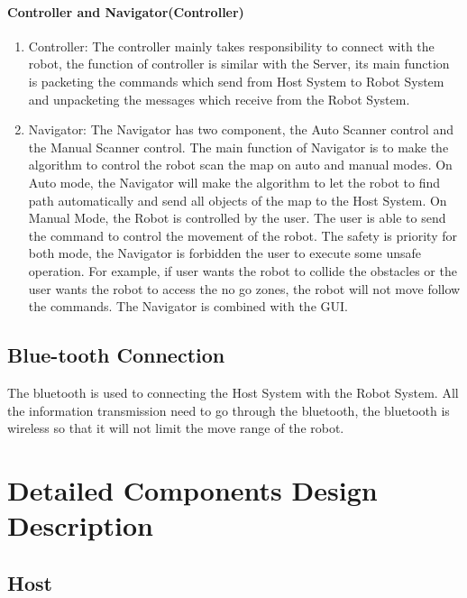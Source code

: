 \documentclass[11pt, a4paper]{report}
\begin{document}
\paragraph{Controller and Navigator(Controller)}
\begin{enumerate}
\item Controller: The controller mainly takes responsibility to connect with the robot, the function of controller is similar with the Server, its main function is packeting the commands which send from Host System to Robot System and unpacketing  the messages which receive from the Robot System.
\item Navigator: The Navigator has two component, the Auto Scanner control and the Manual Scanner control. The main function of Navigator is to make the algorithm to control the robot scan the map on auto and manual modes. On Auto mode, the Navigator will make the algorithm to let the robot to find path automatically  and send all objects of the map to the Host System. On Manual Mode, the Robot is controlled by the user. The user is able to send the command to control the movement of the robot. The safety is priority for both mode, the Navigator is forbidden the user to execute some unsafe operation. For example, if user wants the robot to collide the obstacles or the user wants the robot to access the no go zones, the robot will not move follow the commands. The Navigator is combined with  the GUI.    
\end{enumerate}
\subsection{Blue-tooth Connection}
The bluetooth is used to connecting the Host System with the Robot System. All the information transmission need to go through the bluetooth, the bluetooth is wireless so that it will not limit the move range of the robot.   



\section{Detailed Components Design Description}
\subsection{Host}
\end{document}
